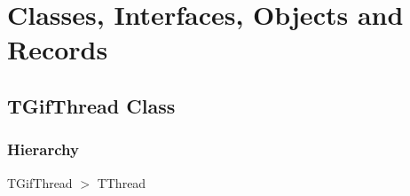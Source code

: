 \documentclass{report}
\newif\ifpdf
\begin{document}
\section{Classes, Interfaces, Objects and Records}
\ifpdf
\subsection*{\large{\textbf{TGifThread Class}}\normalsize\hspace{1ex}\hrulefill}
\else
\subsection*{TGifThread Class}
\fi
\label{gifanimator.TGifThread}
\subsubsection*{\large{\textbf{Hierarchy}}\normalsize\hspace{1ex}\hfill}
TGifThread {$>$} TThread
\end{document}
